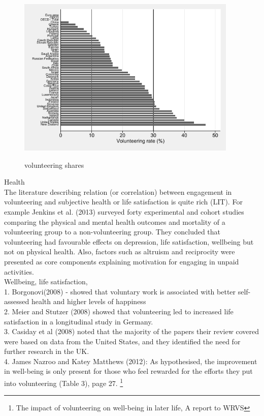 \documentclass[10pt, letterpaper]{article}
\begin{document}
\begin{spacing}{1.4}
\begin{figure}[H]
 \includegraphics[height=3in]{oecd_age50p.pdf}
 \centering
 \label{fig:oecd_50p}
\caption{volunteering shares}
\end{figure}

Health \\
The literature describing relation (or correlation) between engagement in volunteering and subjective health or life satisfaction is quite rich (LIT). For example Jenkins et al. (2013) surveyed forty experimental and cohort studies comparing the physical and mental health outcomes and mortality of a volunteering group to a non-volunteering group. They concluded that volunteering had favourable effects on depression, life satisfaction, wellbeing but not on physical health. Also, factors such as altruism and reciprocity were presented as core components explaining motivation for engaging in unpaid activities. \\

Wellbeing, life satisfaction, \\

1. Borgonovi(2008) - showed that voluntary work is associated with better self-assessed health and higher levels of happiness \\
2. Meier and Stutzer (2008) showed that volunteering led to increased life satisfaction in a longitudinal study in Germany. \\
3. Casiday et al (2008) noted that the majority of the papers their review covered were based on data from the United States, and they identified the need for further research in the UK. \\
4. James Nazroo and Katey Matthews (2012): As hypothesised, the improvement in well-being is only present for those who feel rewarded for the efforts they put into volunteering (Table 3), page 27. \footnote{ The impact of volunteering on well-being in later life, A report to WRVS}


\end{spacing}
\end{document}
